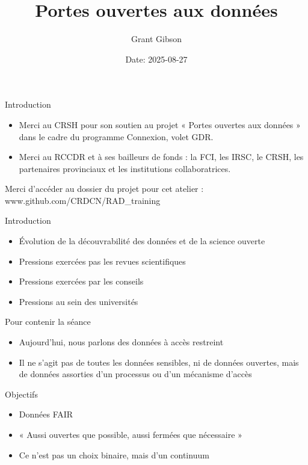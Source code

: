 \documentclass[
  ignorenonframetext,
]{beamer}
\institute{Canadian Research Data Centre Network}{Réseau Canadien Des Centres De Données De Recherche}
\title{Portes ouvertes aux données}
\author{Grant Gibson}
\date{Date: 2025-08-27}
\providecommand{\tightlist}{%
  \setlength{\itemsep}{0pt}\setlength{\parskip}{0pt}}
\begin{document}
\frame{\titlepage}

\begin{frame}{Introduction}
\label{introduction}
\begin{itemize}
\tightlist
\item
  Merci au CRSH pour son soutien au projet « Portes ouvertes aux données
  » dans le cadre du programme Connexion, volet GDR.
\item
  Merci au RCCDR et à ses bailleurs de fonds : la FCI, les IRSC, le
  CRSH, les partenaires provinciaux et les institutions collaboratrices.
\end{itemize}

Merci d'accéder au dossier du projet pour cet atelier :
www.github.com/CRDCN/RAD\_training
\end{frame}

\begin{frame}{Introduction}
\label{introduction-1}
\begin{itemize}
\tightlist
\item
  Évolution de la découvrabilité des données et de la science ouverte
\item
  Pressions exercées pas les revues scientifiques
\item
  Pressions exercées par les conseils
\item
  Pressions au sein des universités
\end{itemize}
\end{frame}

\begin{frame}{Pour contenir la séance}
\label{pour-contenir-la-suxe9ance}
\begin{itemize}
\tightlist
\item
  Aujourd'hui, nous parlons des données à accès restreint
\item
  Il ne s'agit pas de toutes les données sensibles, ni de données
  ouvertes, mais de données assorties d'un processus ou d'un mécanisme
  d'accès
\end{itemize}
\end{frame}

\begin{frame}{Objectifs}
\label{objectifs}
\begin{itemize}
\tightlist
\item
  Données FAIR
\item
  « Aussi ouvertes que possible, aussi fermées que nécessaire »
\item
  Ce n'est pas un choix binaire, mais d'un continuum
\end{itemize}
\end{frame}
\end{document}
